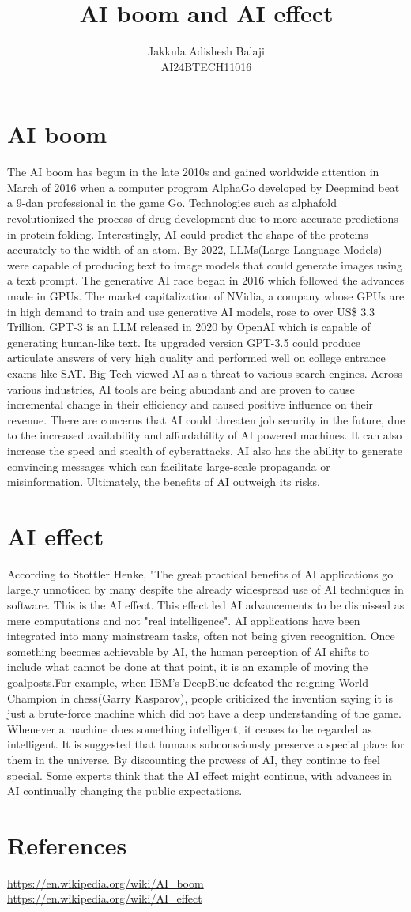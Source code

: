 \documentclass[final]{article}
\title{AI boom and AI effect}
\author{
	Jakkula Adishesh Balaji \\
	AI24BTECH11016 \\ 
	}
\begin{document}
\maketitle

\section{AI boom}
The AI boom has begun in the late 2010s and gained worldwide attention in March of 2016 when a computer program AlphaGo developed by Deepmind beat a 9-dan professional in the game Go. Technologies such as alphafold revolutionized the process of drug development due to more accurate predictions in protein-folding. Interestingly, AI could predict the shape of the proteins accurately to the width of an atom. By 2022, LLMs(Large Language Models) were capable of producing text to image models that could generate images using a text prompt. The generative AI race began in 2016 which followed the advances made in GPUs. The market capitalization of NVidia, a company whose GPUs are in high demand to train and use generative AI models, rose to over US\$ 3.3 Trillion. GPT-3 is an LLM released in 2020 by OpenAI which is capable of generating human-like text. Its upgraded version GPT-3.5 could produce articulate answers of very high quality and performed well on college entrance exams like SAT. Big-Tech viewed AI as a threat to various search engines. Across various industries, AI tools are being abundant and are proven to cause incremental change in their efficiency and caused positive influence on their revenue. There are concerns that AI could threaten job security in the future, due to the increased availability and affordability of AI powered machines. It can also increase the speed and stealth of cyberattacks. AI also has the ability to generate convincing messages which can facilitate large-scale propaganda or misinformation. Ultimately, the benefits of AI outweigh its risks.
\section{AI effect}
According to Stottler Henke, "The great practical benefits of AI applications go largely unnoticed by many despite the already widespread use of AI techniques in software. This is the AI effect. This effect led AI advancements to be dismissed as mere computations and not "real intelligence". AI applications have been integrated into many mainstream tasks, often not being given recognition. Once something becomes achievable by AI, the human perception of AI shifts to include what cannot be done at that point, it is an example of moving the goalposts.For example, when IBM's DeepBlue defeated the reigning World Champion in chess(Garry Kasparov), people criticized the invention saying it is just a brute-force machine which did not have a deep understanding of the game. Whenever a machine does something intelligent, it ceases to be regarded as intelligent. It is suggested that humans subconsciously preserve a special place for them in the universe. By discounting the prowess of AI, they continue to feel special. Some experts think that the AI effect might continue, with advances in AI continually changing the public expectations.
\section{References}
\url{https://en.wikipedia.org/wiki/AI_boom} \\
\url{https://en.wikipedia.org/wiki/AI_effect}
\end{document}
